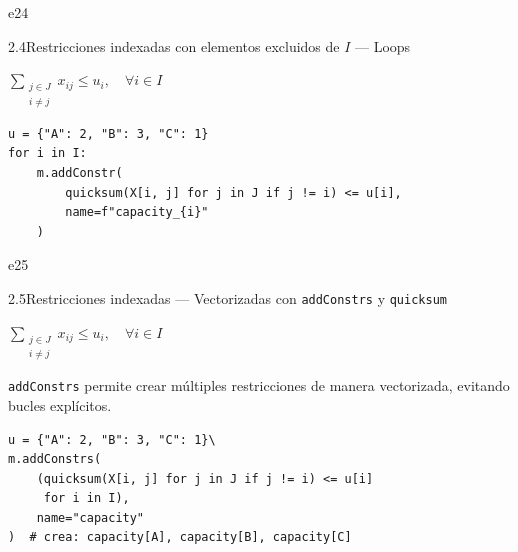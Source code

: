 \documentclass[10pt,a4paper]{article}
\newlength{\mathcolw}
\newlength{\codecolw}
\newcommand{\entryheader}[2][]{%
  \needspace{5cm}%
  \vspace{6pt}%
  \ifx\relax#1\relax\else\phantomsection\hypertarget{#1}{}\fi%
  \noindent%
  \begin{tcolorbox}[
    colback=subsecbg!18,
    colframe=subsecbg!45,
    sharp corners, boxrule=0.4pt,
    left=5pt, right=5pt, top=2pt, bottom=2pt,
    fontupper=\small\bfseries\sffamily,
  ]
  #2
  \end{tcolorbox}%
  \vspace{2pt}%
}
\newcommand{\py}[1]{\texttt{\small #1}}
\begin{document}
\vspace{4pt}

\entryheader[e24]{2.4\quad Restricciones indexadas con elementos excluidos de $I$ --- Loops}
\noindent
\begin{minipage}[t]{\mathcolw}
    \begin{tcolorbox}[mathbox]
        $\displaystyle\sum_{\substack{j \in J \\ i \neq j}} x_{ij} \leq u_i, \quad \forall i \in I$
    \end{tcolorbox}
\end{minipage}\hspace{0.02\textwidth}%
\begin{minipage}[t]{\codecolw}
    \begin{lstlisting}[style=gurobipy]
u = {"A": 2, "B": 3, "C": 1}
for i in I:
    m.addConstr(
        quicksum(X[i, j] for j in J if j != i) <= u[i],
        name=f"capacity_{i}"
    )
\end{lstlisting}
\end{minipage}

\vspace{4pt}

\entryheader[e25]{2.5\quad Restricciones indexadas --- Vectorizadas con \py{addConstrs} y \py{quicksum}}
\noindent
\begin{minipage}[t]{\mathcolw}
    \begin{tcolorbox}[mathbox]
        $\displaystyle\sum_{\substack{j \in J \\ i \neq j}} x_{ij} \leq u_i, \quad \forall i \in I$
    \end{tcolorbox}
    \vspace{2pt}
    \begin{tcolorbox}[notebox]
        \py{addConstrs} permite crear múltiples restricciones de manera vectorizada, evitando bucles explícitos.
    \end{tcolorbox}
\end{minipage}\hspace{0.02\textwidth}%
\begin{minipage}[t]{\codecolw}
    \begin{lstlisting}[style=gurobipy]
u = {"A": 2, "B": 3, "C": 1}\
m.addConstrs(
    (quicksum(X[i, j] for j in J if j != i) <= u[i]
     for i in I),
    name="capacity"
)  # crea: capacity[A], capacity[B], capacity[C]
\end{lstlisting}
\end{minipage}

\vspace{4pt}
\end{document}
